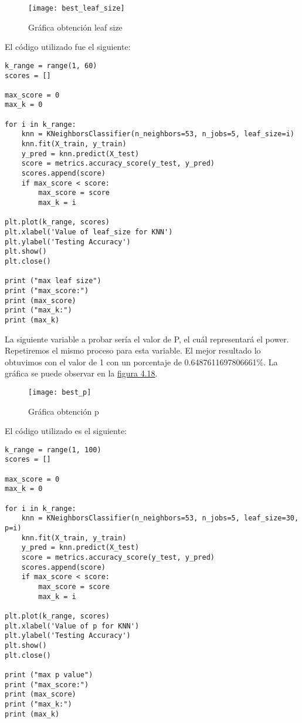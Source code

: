 \begin{figure}[htb]
	\centering
	\texttt{[image: best\_leaf\_size]}
	\caption[Gráfica obtención leaf size]{Gráfica obtención leaf size}
	\label{fig:Gráfica obtención leaf size}
\end{figure}

El código utilizado fue el siguiente:

\begin{lstlisting}
k_range = range(1, 60)
scores = []

max_score = 0
max_k = 0

for i in k_range:
    knn = KNeighborsClassifier(n_neighbors=53, n_jobs=5, leaf_size=i)
    knn.fit(X_train, y_train)
    y_pred = knn.predict(X_test)
    score = metrics.accuracy_score(y_test, y_pred)
    scores.append(score)
    if max_score < score:
        max_score = score
        max_k = i

plt.plot(k_range, scores)
plt.xlabel('Value of leaf_size for KNN')
plt.ylabel('Testing Accuracy')
plt.show()
plt.close()

print ("max leaf size")
print ("max_score:")
print (max_score)
print ("max_k:")
print (max_k)
\end{lstlisting}



La siguiente variable a probar sería el valor de P, el cuál representará el power.
Repetiremos el mismo proceso para esta variable. El mejor resultado lo obtuvimos con
el valor de 1 con un porcentaje de 0.6487611697806661\%. La gráfica se puede observar
en la \hyperref[fig:Gráfica obtención p]{figura 4.18}.

\begin{figure}[htb]
	\centering
	\texttt{[image: best\_p]}
	\caption[Gráfica obtención p]{Gráfica obtención p}
	\label{fig:Gráfica obtención p}
\end{figure}


El código utilizado es el siguiente:
\begin{lstlisting}
k_range = range(1, 100)
scores = []

max_score = 0
max_k = 0

for i in k_range:
    knn = KNeighborsClassifier(n_neighbors=53, n_jobs=5, leaf_size=30, p=i)
    knn.fit(X_train, y_train)
    y_pred = knn.predict(X_test)
    score = metrics.accuracy_score(y_test, y_pred)
    scores.append(score)
    if max_score < score:
        max_score = score
        max_k = i

plt.plot(k_range, scores)
plt.xlabel('Value of p for KNN')
plt.ylabel('Testing Accuracy')
plt.show()
plt.close()

print ("max p value")
print ("max_score:")
print (max_score)
print ("max_k:")
print (max_k)
\end{lstlisting}


